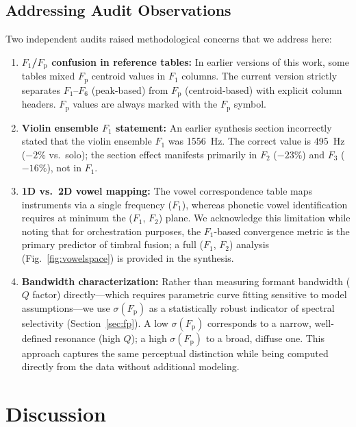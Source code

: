 \documentclass[journal]{IEEEtran}
\newcommand{\Fp}{F_\mathrm{p}}
\newcommand{\Fn}[1]{F_{#1}}
\begin{document}
\subsection{Addressing Audit Observations}
Two independent audits raised methodological concerns that we address here:
\begin{enumerate}
\item \textbf{$\Fn{1}$/$\Fp$ confusion in reference tables:} In earlier versions of this work, some tables mixed $\Fp$ centroid values in $\Fn{1}$ columns. The current version strictly separates $\Fn{1}$--$\Fn{6}$ (peak-based) from $\Fp$ (centroid-based) with explicit column headers. $\Fp$ values are always marked with the $\Fp$ symbol.
\item \textbf{Violin ensemble $\Fn{1}$ statement:} An earlier synthesis section incorrectly stated that the violin ensemble $\Fn{1}$ was \SI{1556}{\hertz}. The correct value is \SI{495}{\hertz} ($-2\%$ vs.\ solo); the section effect manifests primarily in $\Fn{2}$ ($-23\%$) and $\Fn{3}$ ($-16\%$), not in $\Fn{1}$.
\item \textbf{1D vs.\ 2D vowel mapping:} The vowel correspondence table maps instruments via a single frequency ($\Fn{1}$), whereas phonetic vowel identification requires at minimum the ($\Fn{1}$, $\Fn{2}$) plane. We acknowledge this limitation while noting that for orchestration purposes, the $\Fn{1}$-based convergence metric is the primary predictor of timbral fusion; a full ($\Fn{1}$, $\Fn{2}$) analysis (Fig.~\ref{fig:vowelspace}) is provided in the synthesis.
\item \textbf{Bandwidth characterization:} Rather than measuring formant bandwidth ($Q$ factor) directly---which requires parametric curve fitting sensitive to model assumptions---we use $\sigma(\Fp)$ as a statistically robust indicator of spectral selectivity (Section~\ref{sec:fp}). A low $\sigma(\Fp)$ corresponds to a narrow, well-defined resonance (high $Q$); a high $\sigma(\Fp)$ to a broad, diffuse one. This approach captures the same perceptual distinction while being computed directly from the data without additional modeling.
\end{enumerate}

\section{Discussion}
\label{sec:discussion}
\end{document}
